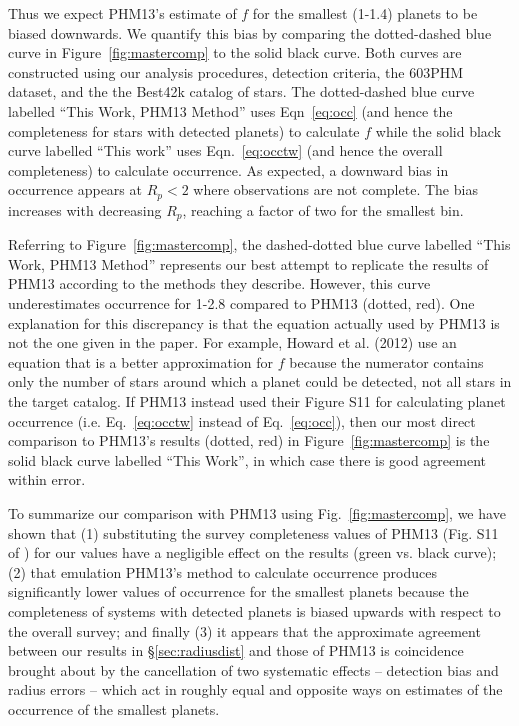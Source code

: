 Thus we expect PHM13's estimate of $f$ for the smallest
(1-1.4\rearth{}) planets to be biased downwards.  We quantify this
bias by comparing the dotted-dashed blue curve in
Figure~\ref{fig:mastercomp} to the solid black curve.  Both curves are
constructed using our analysis procedures, detection criteria, the 603PHM dataset, 
and the the Best42k catalog of stars. The dotted-dashed blue curve labelled 
``This Work, PHM13 Method'' uses Eqn~\ref{eq:occ} (and hence the completeness for
stars with detected planets) to calculate $f$ while the solid black
curve labelled ``This work'' uses Eqn.~\ref{eq:occtw} (and hence the
overall completeness) to calculate occurrence.  As expected, a
downward bias in occurrence appears at $R_p < 2$\rearth{} where \kep{}
observations are not complete. The bias increases with decreasing
$R_p$, reaching a factor of two for the smallest bin.

Referring to Figure~\ref{fig:mastercomp}, the dashed-dotted blue curve
labelled ``This Work, PHM13 Method'' represents our best attempt to
replicate the results of PHM13 according to the methods they describe.
However, this curve underestimates occurrence for 1-2.8\rearth{}
compared to PHM13 (dotted, red). One explanation for this discrepancy
is that the equation actually used by PHM13 is not the one given in
the paper. For example, Howard et al. (2012) use an equation that is a
better approximation for $f$ because the numerator contains only the
number of stars around which a planet could be detected, not all stars
in the target catalog. If PHM13 instead used their Figure S11 for
calculating planet occurrence (i.e. Eq.~\ref{eq:occtw} instead of
Eq.~\ref{eq:occ}), then our most direct comparison to PHM13's results (dotted, red)
in Figure~\ref{fig:mastercomp} is the solid black curve labelled
``This Work'', in which case there is good agreement within error.

To summarize our comparison with PHM13 using
Fig.~\ref{fig:mastercomp}, we have shown that (1) 
substituting the survey completeness values of PHM13 (Fig. S11 of \citet{Petigura2013})
for our values have a negligible effect on the results (green vs. black curve);
(2) that emulation PHM13's method to calculate occurrence produces 
significantly lower values of occurrence for the smallest planets because the
completeness of systems with detected planets is biased upwards with
respect to the overall survey; and finally (3) it appears that the
approximate agreement between our results in 
\S\ref{sec:radiusdist} and those of PHM13 is coincidence
brought about by the cancellation of two systematic effects --
detection bias and radius errors -- which act in roughly equal and
opposite ways on estimates of the occurrence of the smallest planets.


